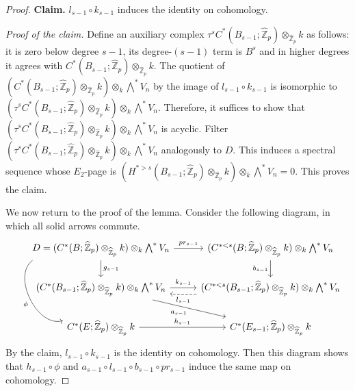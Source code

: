 \documentclass[11pt]{amsart}
\theoremstyle{definition}
\numberwithin{equation}{section}
\numberwithin{equation}{section}
\newcommand\ZZ{\mathbb{Z}}
\begin{document}
\begin{proof}
\textbf{Claim.} $l_{s-1}\circ k_{s-1}$ induces the identity on cohomology.

\textit{Proof of the claim.} Define an auxiliary complex $\tau^s C^*(B_{s-1};\widehat{\ZZ}_p)\otimes_{\widehat{\ZZ}_p} k$ as follows: it is zero below degree $s-1$, its degree-$(s-1)$ term is $B^s$ and in higher degrees it agrees with $C^*(B_{s-1};\widehat{\ZZ}_p)\otimes_{\widehat{\ZZ}_p} k$. The quotient of $(C^{*}(B_{s-1};\widehat{\ZZ}_p)\otimes_{\widehat{\ZZ}_p} k)\otimes_k \bigwedge^*V_n$ by the image of $l_{s-1}\circ k_{s-1}$ is isomorphic to $(\tau^s C^*(B_{s-1};\widehat{\ZZ}_p)\otimes_{\widehat{\ZZ}_p} k)\otimes_k \bigwedge^*V_n$. Therefore, it suffices to show that $(\tau^s C^*(B_{s-1};\widehat{\ZZ}_p)\otimes_{\widehat{\ZZ}_p} k)\otimes_k \bigwedge^*V_n$ is acyclic. Filter $(\tau^s C^*(B_{s-1};\widehat{\ZZ}_p)\otimes_{\widehat{\ZZ}_p} k)\otimes_k \bigwedge^*V_n$ analogously to $D$. This induces a spectral sequence whose $E_2$-page is $(H^{*>s}(B_{s-1};\widehat{\ZZ}_p)\otimes_{\widehat{\ZZ}_p} k)\otimes_{k} \bigwedge^*V_n=0$.  This proves the claim.
\medskip

We now return to the proof of the lemma. Consider the following diagram, in which all solid arrows commute.
\[
\begin{tikzcd}
    D=(C^*(B;\widehat{\ZZ}_p)\otimes_{\widehat{\ZZ}_p} k)\otimes_k \bigwedge^*V_n \arrow[r,"pr_{s-1}"] \arrow[dd,bend right=80,"\phi"'] \arrow[d,"g_{s-1}"] & (C^{*<s}(B;\widehat{\ZZ}_p)\otimes_{\widehat{\ZZ}_p} k)\otimes_k \bigwedge^*V_n \arrow[d,"b_{s-1}"']  \\
    (C^*(B_{s-1};\widehat{\ZZ}_p)\otimes_{\widehat{\ZZ}_p} k)\otimes_k \bigwedge^*V_n \arrow[r,"k_{s-1}"] \arrow[dr,"a_{s-1}"']  & (C^{*<s}(B_{s-1};\widehat{\ZZ}_p)\otimes_{\widehat{\ZZ}_p} k)\otimes_k \bigwedge^*V_n \arrow[l,bend left=5, dashed, "l_{s-1}"]
    \\
   C^*(E;\widehat{\ZZ}_p)\otimes_{\widehat{\ZZ}_p} k \arrow[r,"h_{s-1}"] & C^*(E_{s-1};\widehat{\ZZ}_p)\otimes_{\widehat{\ZZ}_p} k 
\end{tikzcd}
\]
By the claim, $l_{s-1}\circ k_{s-1}$ is the identity on cohomology. Then this diagram shows that $h_{s-1}\circ \phi$ and $a_{s-1} \circ l_{s-1} \circ b_{s-1}\circ pr_{s-1}$ induce the same map on cohomology.


\end{proof}
\end{document}
